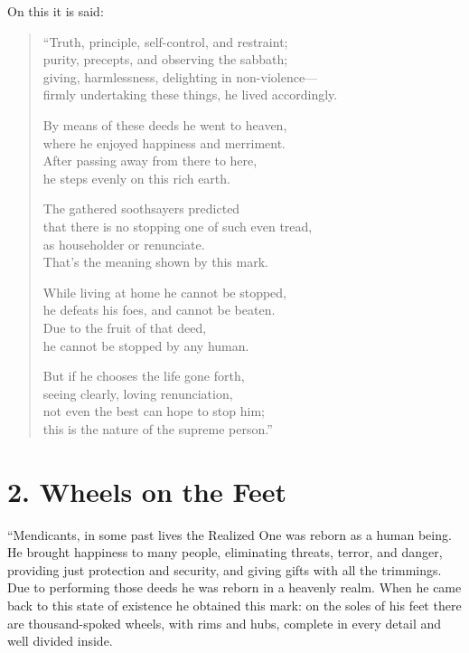 \documentclass[12pt,openany]{book}%
\begin{document}
On this it is said: 

\begin{verse}%
“Truth, principle, self-control, and restraint; \\
purity, precepts, and observing the sabbath; \\
giving, harmlessness, delighting in non-violence—\\
firmly undertaking these things, he lived accordingly. 

By means of these deeds he went to heaven, \\
where he enjoyed happiness and merriment. \\
After passing away from there to here, \\
he steps evenly on this rich earth. 

The gathered soothsayers predicted \\
that there is no stopping one of such even tread, \\
as householder or renunciate. \\
That’s the meaning shown by this mark. 

While living at home he cannot be stopped, \\
he defeats his foes, and cannot be beaten. \\
Due to the fruit of that deed, \\
he cannot be stopped by any human. 

But if he chooses the life gone forth, \\
seeing clearly, loving renunciation, \\
not even the best can hope to stop him; \\
this is the nature of the supreme person.” 

%
\end{verse}

\section*{2. Wheels on the Feet }

“Mendicants, in some past lives the Realized One was reborn as a human being. He brought happiness to many people, eliminating threats, terror, and danger, providing just protection and security, and giving gifts with all the trimmings. Due to performing those deeds he was reborn in a heavenly realm. When he came back to this state of existence he obtained this mark: on the soles of his feet there are thousand-spoked wheels, with rims and hubs, complete in every detail and well divided inside. 
\end{document}
